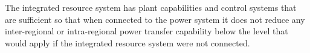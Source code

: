 The integrated resource system has plant capabilities and control systems that are sufficient so that when connected to the power system it does not reduce any inter-regional or intra-regional power transfer capability below the level that would apply if the integrated resource system were not connected.